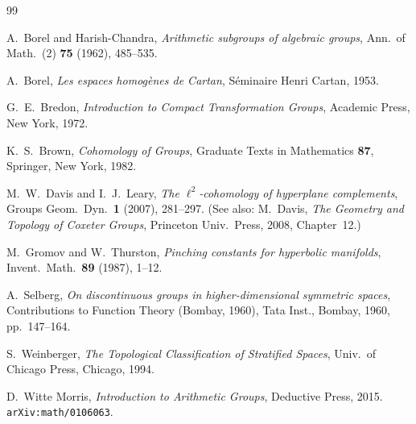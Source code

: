 \documentclass[12pt]{article}
\begin{document}
\begin{thebibliography}{99}

A.~Borel and Harish-Chandra,
\emph{Arithmetic subgroups of algebraic groups},
Ann.\ of Math.\ (2) \textbf{75} (1962), 485--535.

A.~Borel,
\emph{Les espaces homog\`enes de Cartan},
S\'eminaire Henri Cartan, 1953.

G.~E.~Bredon,
\emph{Introduction to Compact Transformation Groups},
Academic Press, New York, 1972.

K.~S.~Brown,
\emph{Cohomology of Groups},
Graduate Texts in Mathematics \textbf{87}, Springer, New York, 1982.

M.~W.~Davis and I.~J.~Leary,
\emph{The $\ell^2$-cohomology of hyperplane complements},
Groups Geom.\ Dyn.\ \textbf{1} (2007), 281--297.
(See also: M.~Davis, \emph{The Geometry and Topology of Coxeter Groups},
Princeton Univ.\ Press, 2008, Chapter~12.)

M.~Gromov and W.~Thurston,
\emph{Pinching constants for hyperbolic manifolds},
Invent.\ Math.\ \textbf{89} (1987), 1--12.

A.~Selberg,
\emph{On discontinuous groups in higher-dimensional symmetric spaces},
Contributions to Function Theory (Bombay, 1960), Tata Inst., Bombay, 1960, pp.\ 147--164.

S.~Weinberger,
\emph{The Topological Classification of Stratified Spaces},
Univ.\ of Chicago Press, Chicago, 1994.

D.~Witte Morris,
\emph{Introduction to Arithmetic Groups},
Deductive Press, 2015. \texttt{arXiv:math/0106063}.

\end{thebibliography}
\end{document}
